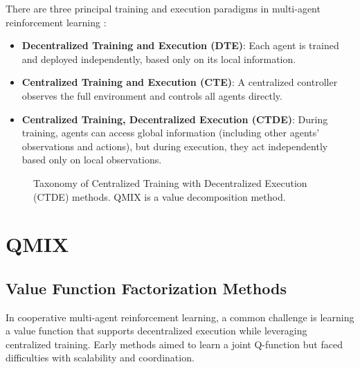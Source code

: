 \documentclass[../Main.tex]{subfiles}
\begin{document}
There are three principal training and execution paradigms in multi-agent reinforcement learning \cite{oroojlooy2023review}:

\begin{itemize}
    \item \textbf{Decentralized Training and Execution (DTE)}: Each agent is trained and deployed independently, based only on its local information.
    \item \textbf{Centralized Training and Execution (CTE)}: A centralized controller observes the full environment and controls all agents directly.
    \item \textbf{Centralized Training, Decentralized Execution (CTDE)}: During training, agents can access global information (including other agents' observations and actions), but during execution, they act independently based only on local observations.
\end{itemize}

\begin{figure}[h]
\centering
{}
\caption{Taxonomy of Centralized Training with Decentralized Execution (CTDE) methods. QMIX is a value decomposition method.}
\label{fig:ctde-taxonomy}
\end{figure}

\section{QMIX}

\subsection{Value Function Factorization Methods}

In cooperative multi-agent reinforcement learning, a common challenge is learning a value function that supports decentralized execution while leveraging centralized training. Early methods aimed to learn a joint Q-function but faced difficulties with scalability and coordination.
\end{document}
